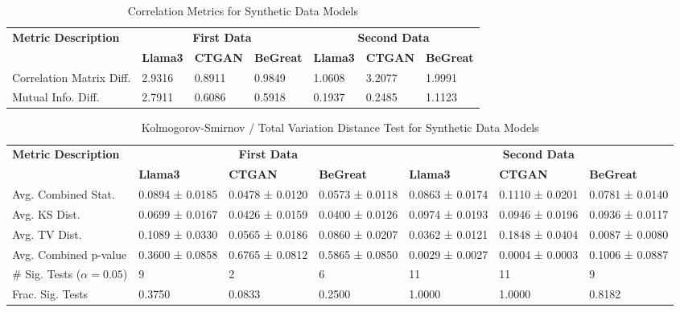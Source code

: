 \begin{table}[H]
    \centering
    \caption{Correlation Metrics for Synthetic Data Models}
    \label{tab:correlation_metrics_combined}
    \begin{tabularx}{\textwidth}{l*{6}{X}}
        \toprule
        \textbf{Metric Description} & \multicolumn{3}{c}{\textbf{First Data}} & \multicolumn{3}{c}{\textbf{Second Data}} \\
        \cmidrule(lr){2-4} \cmidrule(lr){5-7}
        & \textbf{Llama3} & \textbf{CTGAN} & \textbf{BeGreat} & \textbf{Llama3} & \textbf{CTGAN} & \textbf{BeGreat} \\
        \midrule
        Correlation Matrix Diff. & 2.9316 & 0.8911 & 0.9849 & 1.0608 & 3.2077 & 1.9991 \\
        Mutual Info. Diff. & 2.7911 & 0.6086 & 0.5918 & 0.1937 & 0.2485 & 1.1123 \\
        \bottomrule
    \end{tabularx}
\end{table}



\begin{table}[H]
    \centering
    \caption{Kolmogorov-Smirnov / Total Variation Distance Test for Synthetic Data Models}
    \label{tab:ks_tv_test_combined}
    \begin{tabularx}{\textwidth}{l*{6}{X}}
        \toprule
        \textbf{Metric Description} & \multicolumn{3}{c}{\textbf{First Data}} & \multicolumn{3}{c}{\textbf{Second Data}} \\
        \cmidrule(lr){2-4} \cmidrule(lr){5-7}
        & \textbf{Llama3} & \textbf{CTGAN} & \textbf{BeGreat} & \textbf{Llama3} & \textbf{CTGAN} & \textbf{BeGreat} \\
        \midrule
        Avg. Combined Stat. & 0.0894 ± 0.0185 & 0.0478 ± 0.0120 & 0.0573 ± 0.0118 & 0.0863 ± 0.0174 & 0.1110 ± 0.0201 & 0.0781 ± 0.0140 \\
        Avg. KS Dist. & 0.0699 ± 0.0167 & 0.0426 ± 0.0159 & 0.0400 ± 0.0126 & 0.0974 ± 0.0193 & 0.0946 ± 0.0196 & 0.0936 ± 0.0117 \\
        Avg. TV Dist. & 0.1089 ± 0.0330 & 0.0565 ± 0.0186 & 0.0860 ± 0.0207 & 0.0362 ± 0.0121 & 0.1848 ± 0.0404 & 0.0087 ± 0.0080 \\
        Avg. Combined p-value & 0.3600 ± 0.0858 & 0.6765 ± 0.0812 & 0.5865 ± 0.0850 & 0.0029 ± 0.0027 & 0.0004 ± 0.0003 & 0.1006 ± 0.0887 \\
        \# Sig. Tests (\(\alpha=0.05\)) & 9 & 2 & 6 & 11 & 11 & 9 \\
        Frac. Sig. Tests & 0.3750 & 0.0833 & 0.2500 & 1.0000 & 1.0000 & 0.8182 \\
        \bottomrule
    \end{tabularx}
\end{table}


